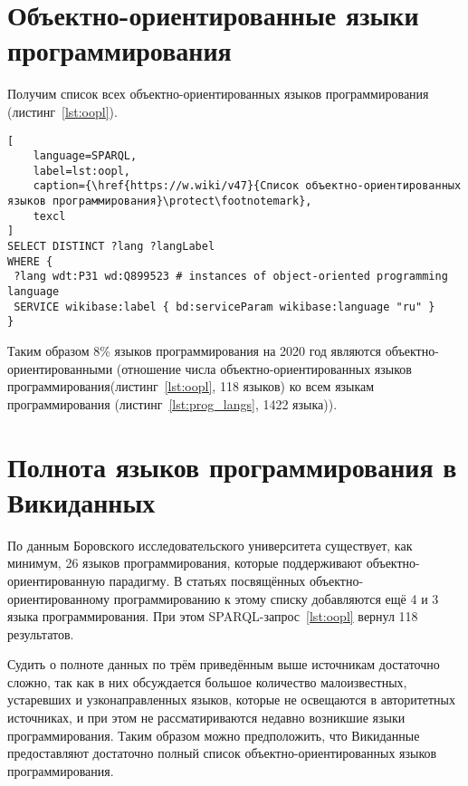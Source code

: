 \section{Объектно-ориентированные языки программирования}
Получим список всех объектно-ориентированных языков программирования (листинг~\ref{lst:oopl}).

\begin{lstlisting}[
	language=SPARQL,
	label=lst:oopl,
	caption={\href{https://w.wiki/v47}{Список объектно-ориентированных языков программирования}\protect\footnotemark},
	texcl
]
SELECT DISTINCT ?lang ?langLabel
WHERE {
 ?lang wdt:P31 wd:Q899523 # instances of object-oriented programming language
 SERVICE wikibase:label { bd:serviceParam wikibase:language "ru" }
}
\end{lstlisting}

Таким образом 8\% языков программирования на 2020 год являются объектно-ориентированными (отношение числа объектно-ориентированных языков программирования(листинг~\ref{lst:oopl}, 118 языков) ко всем языкам программирования (листинг~\ref{lst:prog_langs}, 1422 языка)).

\section{Полнота языков программирования в Викиданных}
По данным Боровского исследовательского университета\cite{oo_langs_bourabai} существует, как минимум, 26 языков программирования, которые поддерживают объектно-ориентированную парадигму. В статьях посвящённых объектно-ориентированному программированию к этому списку добавляются ещё 4\cite{oo_langs_science_wikia} и 3\cite{oo_langs_garshin} языка программирования. При этом SPARQL-запрос~\ref{lst:oopl} вернул 118 результатов.

Судить о полноте данных по трём приведённым выше источникам достаточно сложно, так как в них обсуждается большое количество малоизвестных, устаревших и узконаправленных языков, которые не освещаются в авторитетных источниках, и при этом не рассматириваются недавно возникшие языки программирования. Таким образом можно предположить, что Викиданные предоставляют достаточно полный список объектно-ориентированных языков программирования.

